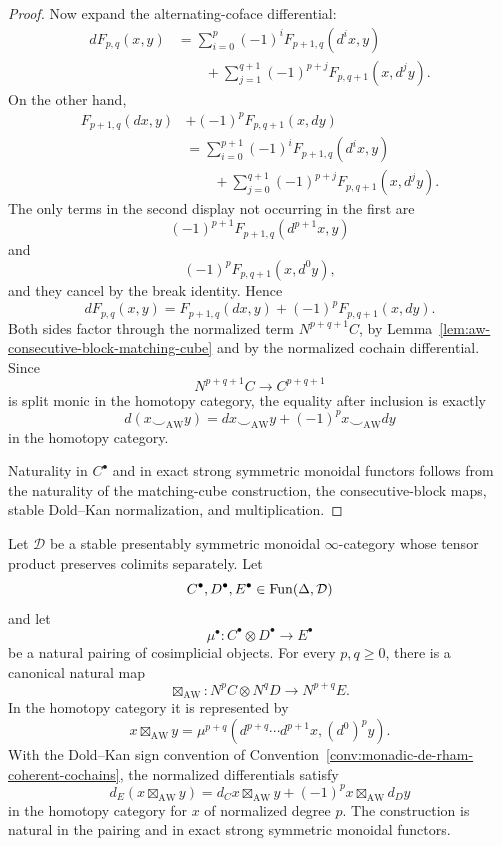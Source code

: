 \begin{proof}
Now expand the alternating-coface differential:
\[
\begin{aligned}
    dF_{p,q}(x,y)
    &=
    \sum_{i=0}^{p}
    (-1)^i
    F_{p+1,q}(d^ix,y)
    \\
    &\qquad+
    \sum_{j=1}^{q+1}
    (-1)^{p+j}
    F_{p,q+1}(x,d^jy).
\end{aligned}
\]
On the other hand,
\[
\begin{aligned}
    F_{p+1,q}(dx,y)
    &+
    (-1)^pF_{p,q+1}(x,dy)
    \\
    &=
    \sum_{i=0}^{p+1}
    (-1)^i
    F_{p+1,q}(d^ix,y)
    \\
    &\qquad+
    \sum_{j=0}^{q+1}
    (-1)^{p+j}
    F_{p,q+1}(x,d^jy).
\end{aligned}
\]
The only terms in the second display not occurring in the first are
\[
    (-1)^{p+1}
    F_{p+1,q}(d^{p+1}x,y)
\]
and
\[
    (-1)^p
    F_{p,q+1}(x,d^0y),
\]
and they cancel by the break identity.  Hence
\[
    dF_{p,q}(x,y)
    =
    F_{p+1,q}(dx,y)
    +
    (-1)^pF_{p,q+1}(x,dy).
\]
Both sides factor through the normalized term \(N^{p+q+1}C\), by
Lemma~\ref{lem:aw-consecutive-block-matching-cube} and by the normalized
cochain differential.  Since
\[
    N^{p+q+1}C\longrightarrow C^{p+q+1}
\]
is split monic in the homotopy category, the equality after inclusion is
exactly
\[
    d(x\smile_{\mathrm{AW}}y)
    =
    dx\smile_{\mathrm{AW}}y
    +
    (-1)^p x\smile_{\mathrm{AW}}dy
\]
in the homotopy category.

Naturality in \(C^\bullet\) and in exact strong symmetric monoidal functors
follows from the naturality of the matching-cube construction, the
consecutive-block maps, stable Dold--Kan normalization, and multiplication.
\end{proof}

\begin{proposition}
\label{prop:paired-ordered-monoidal-stable-dold-kan}
Let \(\mathcal D\) be a stable presentably symmetric monoidal \(\infty\)-category whose tensor
product preserves colimits separately.  Let
\[
    C^\bullet,D^\bullet,E^\bullet\in\operatorname{Fun}(\Delta,\mathcal D)
\]
and let
\[
    \mu^\bullet:
    C^\bullet\otimes D^\bullet
    \longrightarrow
    E^\bullet
\]
be a natural pairing of cosimplicial objects.  For every \(p,q\geq0\), there is a canonical natural
map
\[
\boxed{
    \boxtimes_{\mathrm{AW}}:
    N^pC\otimes N^qD
    \longrightarrow
    N^{p+q}E.
}
\]
In the homotopy category it is represented by
\[
\boxed{
    x\boxtimes_{\mathrm{AW}}y
    =
    \mu^{p+q}
    \left(
        d^{p+q}\cdots d^{p+1}x,
        (d^0)^py
    \right).
}
\]
With the Dold--Kan sign convention of
Convention~\ref{conv:monadic-de-rham-coherent-cochains}, the normalized differentials satisfy
\[
\boxed{
    d_E(x\boxtimes_{\mathrm{AW}}y)
    =
    d_Cx\boxtimes_{\mathrm{AW}}y
    +
    (-1)^p
    x\boxtimes_{\mathrm{AW}}d_Dy
}
\]
in the homotopy category for \(x\) of normalized degree \(p\).  The construction is natural in the
pairing and in exact strong symmetric monoidal functors.
\end{proposition}

